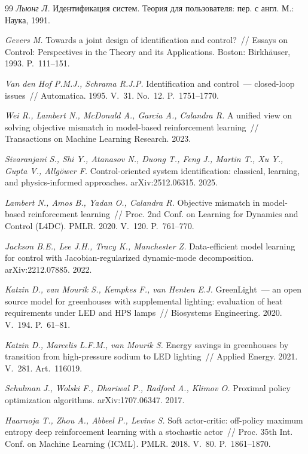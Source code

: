\documentclass[12pt,a4paper,leqno]{article}
\begin{document}
\begin{thebibliography}{99}
\textit{Льюнг Л.} Идентификация систем. Теория для пользователя: пер. с англ. М.: Наука,
1991.

\textit{Gevers M.} Towards a joint design of identification and control?~// Essays on
Control: Perspectives in the Theory and its Applications. Boston: Birkh\"auser, 1993.
P.~111--151.

\textit{Van den Hof P.M.J., Schrama R.J.P.} Identification and control~--- closed-loop
issues~// Automatica. 1995. V.~31. No.~12. P.~1751--1770.

\textit{Wei R., Lambert N., McDonald A., Garcia A., Calandra R.} A unified view on
solving objective mismatch in model-based reinforcement learning~// Transactions on
Machine Learning Research. 2023.

\textit{Sivaranjani S., Shi Y., Atanasov N., Duong T., Feng J., Martin T., Xu Y., Gupta
V., Allg\"ower F.} Control-oriented system identification: classical, learning, and
physics-informed approaches. arXiv:2512.06315. 2025.

\textit{Lambert N., Amos B., Yadan O., Calandra R.} Objective mismatch in model-based
reinforcement learning~// Proc. 2nd Conf. on Learning for Dynamics and Control (L4DC).
PMLR. 2020. V.~120. P.~761--770.

\textit{Jackson B.E., Lee J.H., Tracy K., Manchester Z.} Data-efficient model learning
for control with Jacobian-regularized dynamic-mode decomposition. arXiv:2212.07885. 2022.

\textit{Katzin D., van Mourik S., Kempkes F., van Henten E.J.} GreenLight~--- an open
source model for greenhouses with supplemental lighting: evaluation of heat requirements
under LED and HPS lamps~// Biosystems Engineering. 2020. V.~194. P.~61--81.

\textit{Katzin D., Marcelis L.F.M., van Mourik S.} Energy savings in greenhouses by
transition from high-pressure sodium to LED lighting~// Applied Energy. 2021. V.~281.
Art.~116019.

\textit{Schulman J., Wolski F., Dhariwal P., Radford A., Klimov O.} Proximal policy
optimization algorithms. arXiv:1707.06347. 2017.

\textit{Haarnoja T., Zhou A., Abbeel P., Levine S.} Soft actor-critic: off-policy maximum
entropy deep reinforcement learning with a stochastic actor~// Proc. 35th Int. Conf. on
Machine Learning (ICML). PMLR. 2018. V.~80. P.~1861--1870.


\end{thebibliography}
\end{document}
